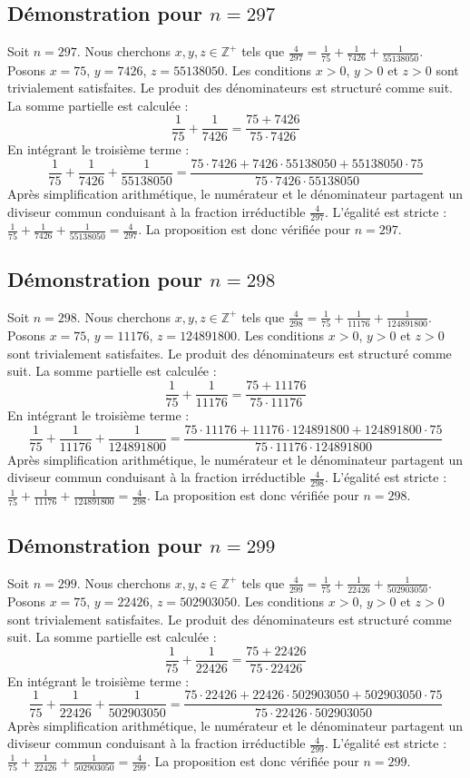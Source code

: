 \documentclass[11pt,a4paper]{article}
\begin{document}
\subsection{Démonstration pour $n = 297$}
Soit $n = 297$. Nous cherchons $x, y, z \in \mathbb{Z}^{+}$ tels que $\frac{4}{297} = \frac{1}{75} + \frac{1}{7426} + \frac{1}{55138050}$.
Posons $x = 75$, $y = 7426$, $z = 55138050$.
Les conditions $x > 0$, $y > 0$ et $z > 0$ sont trivialement satisfaites.
Le produit des dénominateurs est structuré comme suit. La somme partielle est calculée :
$$ \frac{1}{75} + \frac{1}{7426} = \frac{75+7426}{75 \cdot 7426} $$
En intégrant le troisième terme :
$$ \frac{1}{75} + \frac{1}{7426} + \frac{1}{55138050} = \frac{75 \cdot 7426 + 7426 \cdot 55138050 + 55138050 \cdot 75}{75 \cdot 7426 \cdot 55138050} $$
Après simplification arithmétique, le numérateur et le dénominateur partagent un diviseur commun conduisant à la fraction irréductible $\frac{4}{297}$.
L'égalité est stricte : $\frac{1}{75} + \frac{1}{7426} + \frac{1}{55138050} = \frac{4}{297}$.
La proposition est donc vérifiée pour $n = 297$.
\subsection{Démonstration pour $n = 298$}
Soit $n = 298$. Nous cherchons $x, y, z \in \mathbb{Z}^{+}$ tels que $\frac{4}{298} = \frac{1}{75} + \frac{1}{11176} + \frac{1}{124891800}$.
Posons $x = 75$, $y = 11176$, $z = 124891800$.
Les conditions $x > 0$, $y > 0$ et $z > 0$ sont trivialement satisfaites.
Le produit des dénominateurs est structuré comme suit. La somme partielle est calculée :
$$ \frac{1}{75} + \frac{1}{11176} = \frac{75+11176}{75 \cdot 11176} $$
En intégrant le troisième terme :
$$ \frac{1}{75} + \frac{1}{11176} + \frac{1}{124891800} = \frac{75 \cdot 11176 + 11176 \cdot 124891800 + 124891800 \cdot 75}{75 \cdot 11176 \cdot 124891800} $$
Après simplification arithmétique, le numérateur et le dénominateur partagent un diviseur commun conduisant à la fraction irréductible $\frac{4}{298}$.
L'égalité est stricte : $\frac{1}{75} + \frac{1}{11176} + \frac{1}{124891800} = \frac{4}{298}$.
La proposition est donc vérifiée pour $n = 298$.
\subsection{Démonstration pour $n = 299$}
Soit $n = 299$. Nous cherchons $x, y, z \in \mathbb{Z}^{+}$ tels que $\frac{4}{299} = \frac{1}{75} + \frac{1}{22426} + \frac{1}{502903050}$.
Posons $x = 75$, $y = 22426$, $z = 502903050$.
Les conditions $x > 0$, $y > 0$ et $z > 0$ sont trivialement satisfaites.
Le produit des dénominateurs est structuré comme suit. La somme partielle est calculée :
$$ \frac{1}{75} + \frac{1}{22426} = \frac{75+22426}{75 \cdot 22426} $$
En intégrant le troisième terme :
$$ \frac{1}{75} + \frac{1}{22426} + \frac{1}{502903050} = \frac{75 \cdot 22426 + 22426 \cdot 502903050 + 502903050 \cdot 75}{75 \cdot 22426 \cdot 502903050} $$
Après simplification arithmétique, le numérateur et le dénominateur partagent un diviseur commun conduisant à la fraction irréductible $\frac{4}{299}$.
L'égalité est stricte : $\frac{1}{75} + \frac{1}{22426} + \frac{1}{502903050} = \frac{4}{299}$.
La proposition est donc vérifiée pour $n = 299$.
\end{document}
